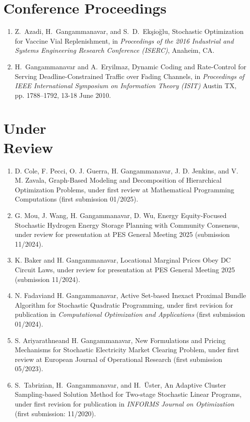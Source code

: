 \documentclass[hyperref, margin]{myResume}
\newif\ifpublic
\begin{document}
\begin{resume}
\section{Conference Proceedings}
\begin{enumerate}[label=C\arabic*., leftmargin=*]
	\item  Z.\ Azadi\footnotemark[3], H.\ Gangammanavar, and S.\ D.\ Ek{\c{s}}io{\u{g}}lu, Stochastic Optimization for Vaccine Vial Replenishment, in \textit{Proceedings of the 2016 Industrial and Systems Engineering Research Conference (ISERC)}, Anaheim, CA.
	\item H.\ Gangammanavar and A.\ Eryilmaz, Dynamic Coding and Rate-Control for Serving Deadline-Constrained Traffic over Fading Channels, in \textit{Proceedings of IEEE International Symposium on Information Theory (ISIT)} Austin TX, pp. 1788--1792, 13-18 June 2010.
\end{enumerate}

\section{Under\\Review}
\begin{enumerate}[label=R\arabic*., leftmargin=*] 
	\item D. Cole, F. Pecci, O. J. Guerra, H. Gangammanavar, J. D. Jenkins, and V. M. Zavala, Graph-Based Modeling and Decomposition of Hierarchical Optimization Problems, \ifpublic 2025 (first review). \else under first review at Mathematical Programming Computations (first submission 01/2025).\fi
	\item G. Mou, J. Wang, H. Gangammanavar, D. Wu, Energy Equity-Focused Stochastic Hydrogen Energy Storage Planning with Community Consensus, \ifpublic 2024 (first review). \else under review for presentation at PES General Meeting 2025 (submission 11/2024).\fi
	\item K. Baker and H. Gangammanavar, Locational Marginal Prices Obey DC Circuit Laws,  \ifpublic 2024 (first review). \else under review for presentation at PES General Meeting 2025 (submission 11/2024).\fi
	\item N. Fadavi\footnotemark[1] and H. Gangammanavar, Active Set-based Inexact Proximal Bundle Algorithm for Stochastic Quadratic Programming, \ifpublic 2024 (first revision). \else under first revision for publication in \textit{Computational Optimization and Applications} (first submission 01/2024)\fi.
	\item S. Ariyarathne\footnotemark[1] and H. Gangammanavar, New Formulations and Pricing Mechanisms for Stochastic Electricity Market Clearing Problem, \ifpublic 2023 (first revision). \else under first review at European Journal of Operational Research (first submission 05/2023).\fi
	\item S.\ Tabrizian\footnotemark[1], H.\ Gangammanavar, and H.\ \"{U}ster, An Adaptive Cluster Sampling-based Solution Method for Two-stage Stochastic Linear Programs, \ifpublic 2020. \else under first revision for publication in \textit{INFORMS Journal on Optimization} (first submission: 11/2020). \fi
\end{enumerate}


\end{resume}
\end{document}
